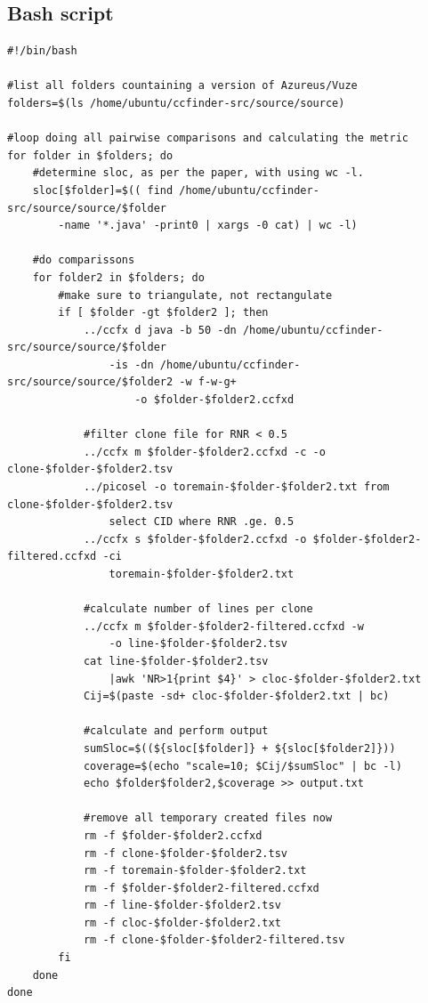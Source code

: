 \documentclass[a4paper,twoside, twocolumn, 11pt]{article}
\numberwithin{equation}{section}
\begin{document}
\onecolumn
\pagestyle{empty} %
\begin{appendices}
\section{Bash script}\label{script}
\scriptsize
\begin{verbatim}
#!/bin/bash

#list all folders countaining a version of Azureus/Vuze
folders=$(ls /home/ubuntu/ccfinder-src/source/source)

#loop doing all pairwise comparisons and calculating the metric
for folder in $folders; do
    #determine sloc, as per the paper, with using wc -l.
    sloc[$folder]=$(( find /home/ubuntu/ccfinder-src/source/source/$folder 
        -name '*.java' -print0 | xargs -0 cat) | wc -l)

    #do comparissons
    for folder2 in $folders; do    
        #make sure to triangulate, not rectangulate
        if [ $folder -gt $folder2 ]; then     
            ../ccfx d java -b 50 -dn /home/ubuntu/ccfinder-src/source/source/$folder 
                -is -dn /home/ubuntu/ccfinder-src/source/source/$folder2 -w f-w-g+ 
                    -o $folder-$folder2.ccfxd 

            #filter clone file for RNR < 0.5
            ../ccfx m $folder-$folder2.ccfxd -c -o clone-$folder-$folder2.tsv            
            ../picosel -o toremain-$folder-$folder2.txt from clone-$folder-$folder2.tsv 
                select CID where RNR .ge. 0.5
            ../ccfx s $folder-$folder2.ccfxd -o $folder-$folder2-filtered.ccfxd -ci 
                toremain-$folder-$folder2.txt

            #calculate number of lines per clone
            ../ccfx m $folder-$folder2-filtered.ccfxd -w 
                -o line-$folder-$folder2.tsv 
            cat line-$folder-$folder2.tsv
                |awk 'NR>1{print $4}' > cloc-$folder-$folder2.txt
            Cij=$(paste -sd+ cloc-$folder-$folder2.txt | bc)

            #calculate and perform output
            sumSloc=$((${sloc[$folder]} + ${sloc[$folder2]}))
            coverage=$(echo "scale=10; $Cij/$sumSloc" | bc -l)
            echo $folder$folder2,$coverage >> output.txt

            #remove all temporary created files now
            rm -f $folder-$folder2.ccfxd
            rm -f clone-$folder-$folder2.tsv
            rm -f toremain-$folder-$folder2.txt 
            rm -f $folder-$folder2-filtered.ccfxd
            rm -f line-$folder-$folder2.tsv
            rm -f cloc-$folder-$folder2.txt
            rm -f clone-$folder-$folder2-filtered.tsv
        fi
    done
done



\end{verbatim}
\end{appendices}
\end{document}
